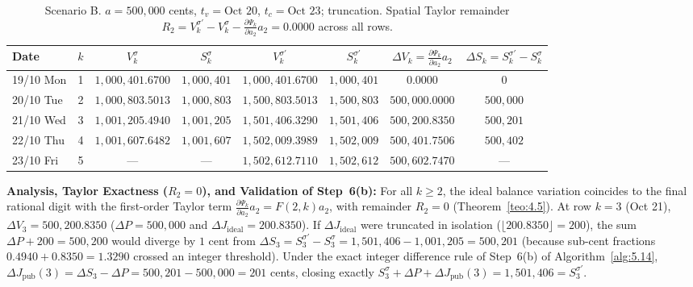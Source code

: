 \documentclass[11pt, a4paper]{article}
\theoremstyle{definition}
\theoremstyle{plain}
\theoremstyle{remark}
\begin{document}
\begin{table}[htbp]
\centering
\footnotesize
\setlength{\tabcolsep}{4.2pt}
\begin{tabular}{@{}lccccccc@{}}
\toprule
\textbf{Date} & $k$ & $V_k^\sigma$ & $S_k^\sigma$ & $V_k^{\sigma'}$ & $S_k^{\sigma'}$ & $\Delta V_k = \frac{\partial \Psi_k}{\partial a_2}a_2$ & $\Delta S_k = S_k^{\sigma'} - S_k^\sigma$ \\
\midrule
19/10 Mon & 1 & $1,000,401.6700$ & $1,000,401$ & $1,000,401.6700$ & $1,000,401$ & $0.0000$       & $0$ \\
20/10 Tue & 2 & $1,000,803.5013$ & $1,000,803$ & $1,500,803.5013$ & $1,500,803$ & $500,000.0000$ & $500,000$ \\
21/10 Wed & 3 & $1,001,205.4940$ & $1,001,205$ & $1,501,406.3290$ & $1,501,406$ & $500,200.8350$ & $500,201$ \\
22/10 Thu & 4 & $1,001,607.6482$ & $1,001,607$ & $1,502,009.3989$ & $1,502,009$ & $500,401.7506$ & $500,402$ \\
23/10 Fri & 5 & ---                & ---         & $1,502,612.7110$ & $1,502,612$ & $500,602.7470$ & --- \\
\bottomrule
\end{tabular}
\caption{Scenario B. $a = 500,000$ cents, $t_v = \text{Oct 20}$, $t_c = \text{Oct 23}$; truncation. Spatial Taylor remainder $R_2 = V_k^{\sigma'} - V_k^\sigma - \frac{\partial \Psi_k}{\partial a_2}a_2 = 0.0000$ across all rows.}
\label{tab:7}
\end{table}

\textbf{Analysis, Taylor Exactness ($R_2 = 0$), and Validation of Step~6(b):} For all $k \ge 2$, the ideal balance variation coincides to the final rational digit with the first-order Taylor term $\frac{\partial \Psi_k}{\partial a_2}a_2 = F(2,k)a_2$, with remainder $R_2 = 0$ (Theorem~\ref{teo:4.5}). At row $k=3$ (Oct 21), $\Delta V_3 = 500,200.8350$ ($\Delta P = 500,000$ and $\Delta J_{\text{ideal}} = 200.8350$). If $\Delta J_{\text{ideal}}$ were truncated in isolation ($\lfloor 200.8350 \rfloor = 200$), the sum $\Delta P + 200 = 500,200$ would diverge by $1$ cent from $\Delta S_3 = S_3^{\sigma'} - S_3^\sigma = 1,501,406 - 1,001,205 = 500,201$ (because sub-cent fractions $0.4940 + 0.8350 = 1.3290$ crossed an integer threshold). Under the exact integer difference rule of Step~6(b) of Algorithm~\ref{alg:5.14}, $\Delta J_{\text{pub}}(3) = \Delta S_3 - \Delta P = 500,201 - 500,000 = 201$ cents, closing exactly $S_3^\sigma + \Delta P + \Delta J_{\text{pub}}(3) = 1,501,406 = S_3^{\sigma'}$.
\end{document}
